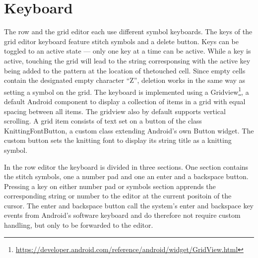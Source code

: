\section{Keyboard}
The row and the grid editor each use different symbol keyboards. The keys of the grid editor keyboard feature stitch symbols and a delete button. Keys can be toggled to an active state --- only one key at a time can be active. While a key is active, touching the grid will lead to the string corresponsing with the active key being added to the pattern at the location of thetouched cell. Since empty cells contain the designated empty character ``Z'', deletion works in the same way as setting a symbol on the grid. The keyboard is implemented using a Gridview\footnote{\url{https://developer.android.com/reference/android/widget/GridView.html}}, a default Android component to display a collection of items in a grid with equal spacing between all items. The gridview also by default supports vertical scrolling. A grid item consists of text set on a button of the class KnittingFontButton, a custom class extending Android’s own Button widget. The custom button sets the knitting font to display its string title as a knitting symbol. 

In the row editor the keyboard is divided in three sections. One section contains the stitch symbols, one a number pad and one an enter and a backspace button. Pressing a key on either number pad or symbols section apprends the corresponding string or number to the editor at the current positoin of the cursor. The enter and backspace button call the system’s enter and backspace key events from Android’s software keyboard and do therefore not require custom handling, but only to be forwarded to the editor.

